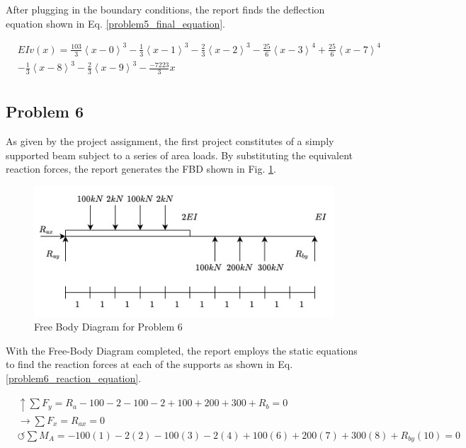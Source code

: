 \documentclass[a4paper]{article}
\begin{document}
After plugging in the boundary conditions, the report finds the deflection equation shown in Eq. \ref{problem5_final_equation}.

\begin{equation}
\begin{split}
  & EI v(x) = \frac{103}{3}\left<x-0\right>^3 - \frac{1}{3}\left<x-1\right>^3 -  \frac{2}{3}\left<x-2\right>^3 - \frac{25}{6}\left<x-3\right>^4 + \frac{25}{6}\left<x-7\right>^4 \\
& - \frac{1}{3}\left<x-8\right>^3 -  \frac{2}{3}\left<x-9\right>^3 - \frac{-7223}{3}x\\
\end{split}
\label{problem5_final_equation}
\end{equation}



\subsection{Problem 6}

As given by the project assignment, the first project constitutes of a simply supported beam subject to a series of area loads. By substituting the equivalent reaction forces, the report generates the FBD shown in Fig. \ref{FBD_6}.

\begin{figure}[h]
\includegraphics[width=\textwidth]{FBD/FBD_6.jpg}
\caption{Free Body Diagram for Problem 6}
\label{FBD_6}
\end{figure}

With the Free-Body Diagram completed, the report employs the static equations to find the reaction forces at each of the supports as shown in Eq. \ref{problem6_reaction_equation}.

\begin{equation}
\begin{split}
	&\uparrow \sum F_y = R_a - 100 - 2 - 100 -2 + 100 + 200 + 300 + R_b = 0 \\
 	&\rightarrow \sum F_x = R_{ax} = 0 \\
 	&\circlearrowleft \sum M_A = -100(1) - 2(2) -100(3) - 2(4) +100(6) + 200(7) + 300(8) + R_{by}(10) = 0 \\
\end{split}
\label{problem6_reaction_equation}
\end{equation}
\end{document}
